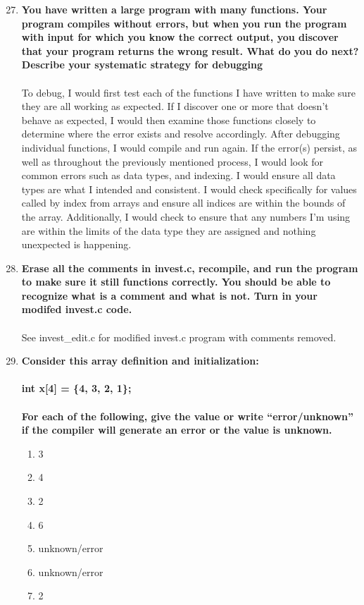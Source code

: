 \documentclass{article}
\begin{document}
\begin{enumerate}[label=\textbf{\arabic*})]
    \setcounter{enumi}{26}
    \item \textbf{You have written a large program with many functions. Your program compiles without
    errors, but when you run the program with input for which you know the correct output,
    you discover that your program returns the wrong result. What do you do next? Describe
    your systematic strategy for debugging} \\ \\
    To debug, I would first test each of the functions I have written to make sure 
    they are all working as expected. If I discover one or more that doesn't behave 
    as expected, I would then examine those functions closely to determine where the 
    error exists and resolve accordingly. After debugging individual functions, I 
    would compile and run again. If the error(s) persist, as well as throughout the 
    previously mentioned process, I would look for common errors such as data types, 
    and indexing. I would ensure all data types are what I intended and consistent. 
    I would check specifically for values called by index from arrays and ensure 
    all indices are within the bounds of the array. Additionally, I would check to 
    ensure that any numbers I'm using are within the limits of the data type they 
    are assigned and nothing unexpected is happening.
    \item \textbf{Erase all the comments in invest.c, recompile, and run the program to make sure it still
    functions correctly. You should be able to recognize what is a comment and what is not.
    Turn in your modifed invest.c code.} \\ \\
    See invest\_edit.c for modified invest.c program with comments removed.

    \pagebreak
    \setcounter{enumi}{29}
    \item \textbf{Consider this array definition and initialization: \\ \\
    int x[4] = \{4, 3, 2, 1\}; \\ \\
    For each of the following, give the value or write “error/unknown” if the compiler will
    generate an error or the value is unknown.}
    \begin{enumerate}[label=\textbf{\alph*}.]
        \item 3
        \item 4
        \item 2
        \item 6
        \item unknown/error
        \item unknown/error
        \item 2
    \end{enumerate}


\end{enumerate}
\end{document}
